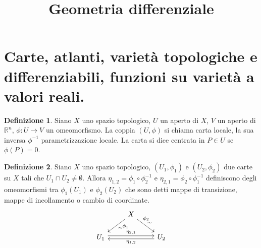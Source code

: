 \documentclass[a4paper,11pt]{article}
\title{Geometria differenziale}
\theoremstyle{definition}
\newtheorem{definizione}{Definizione}[section]
\theoremstyle{theorem}
\begin{document}
\maketitle
\tableofcontents
\newpage
\section{Carte, atlanti, varietà topologiche e differenziabili, funzioni su varietà a valori reali.}
\begin{definizione}
	Siano $X$ uno spazio topologico, $U$ un aperto di $X$, $V$ un aperto di $\mathbb{R}^n$, $\phi\colon U\to V$ un omeomorfismo. La coppia $(U,\phi)$ si chiama carta locale, la sua inversa $\phi^{-1}$ parametrizzazione locale. La carta si dice centrata in $P\in U$ se $\phi(P)=0$.
\end{definizione}
\begin{definizione}
	Siano $X$ uno spazio topologico, $(U_1,\phi_1)$ e $(U_2,\phi_2)$ due carte su $X$ tali che $U_1\cap U_2\neq\emptyset$. Allora $\eta_{1,2}=\phi_1\circ\phi_2^{-1}$ e $\eta_{2,1}=\phi_2\circ\phi_1^{-1}$ definiscono degli omeomorfismi tra $\phi_1(U_1)$ e $\phi_2(U_2)$ che sono detti mappe di transizione, mappe di incollamento o cambio di coordinate.
	\[\begin{tikzcd}
	& X \arrow[dl, "\sim", "\phi_1" near start] \arrow[dr, "\sim", "\phi_2" near start] \\
	U_1 \arrow[rr, "\eta_{2,1}", shift left=0.5ex] & & U_2 \arrow[ll, "\eta_{1,2}", shift left=0.5ex]
	\end{tikzcd}\]
\end{definizione}
\end{document}
